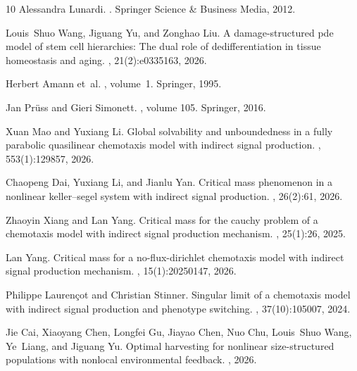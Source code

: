 \documentclass[pdflatex,sn-mathphys-num]{sn-jnl}%
\theoremstyle{thmstyleone}
\theoremstyle{thmstyletwo}
\theoremstyle{thmstylethree}
\begin{document}
\begin{thebibliography}{10}
Alessandra Lunardi.
.
\newblock Springer Science \& Business Media, 2012.

Louis~Shuo Wang, Jiguang Yu, and Zonghao Liu.
\newblock A damage-structured pde model of stem cell hierarchies: The dual role of dedifferentiation in tissue homeostasis and aging.
, 21(2):e0335163, 2026.

Herbert Amann et~al.
, volume~1.
\newblock Springer, 1995.

Jan Pr{\"u}ss and Gieri Simonett.
, volume 105.
\newblock Springer, 2016.

Xuan Mao and Yuxiang Li.
\newblock Global solvability and unboundedness in a fully parabolic quasilinear chemotaxis model with indirect signal production.
, 553(1):129857, 2026.

Chaopeng Dai, Yuxiang Li, and Jianlu Yan.
\newblock Critical mass phenomenon in a nonlinear keller--segel system with indirect signal production.
, 26(2):61, 2026.

Zhaoyin Xiang and Lan Yang.
\newblock Critical mass for the cauchy problem of a chemotaxis model with indirect signal production mechanism.
, 25(1):26, 2025.

Lan Yang.
\newblock Critical mass for a no-flux-dirichlet chemotaxis model with indirect signal production mechanism.
, 15(1):20250147, 2026.

Philippe Lauren{\c{c}}ot and Christian Stinner.
\newblock Singular limit of a chemotaxis model with indirect signal production and phenotype switching.
, 37(10):105007, 2024.

Jie Cai, Xiaoyang Chen, Longfei Gu, Jiayao Chen, Nuo Chu, Louis~Shuo Wang, Ye~Liang, and Jiguang Yu.
\newblock Optimal harvesting for nonlinear size-structured populations with nonlocal environmental feedback.
, 2026.


\end{thebibliography}
\end{document}
